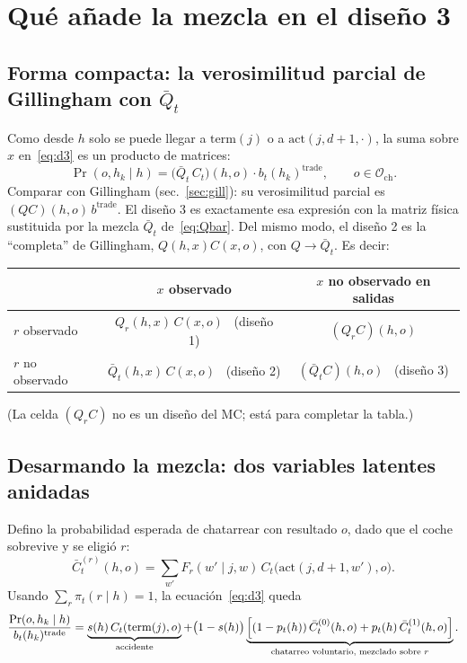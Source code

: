 \documentclass[11pt]{article}
\newcommand{\act}{\mathrm{act}}
\newcommand{\term}{\mathrm{term}}
\newcommand{\buy}{b}
\newcommand{\1}{\mathbf{1}}
\newcommand{\Osc}{\mathcal{O}_{\mathrm{ch}}}
\newcommand{\Qbar}{\bar Q}
\begin{document}
\section{Qué añade la mezcla en el diseño 3}\label{sec:mezcla3}

\subsection{Forma compacta: la verosimilitud parcial de Gillingham con $\Qbar_t$}

Como desde $h$ solo se puede llegar a $\term(j)$ o a $\act(j,d+1,\cdot)$, la suma sobre $x$
en~\eqref{eq:d3} es un producto de matrices:
\begin{equation}\label{eq:compacta}
  \boxed{\;\Pr(o,h_k\mid h)=\bigl(\Qbar_t\,C_t\bigr)(h,o)\cdot\buy_t(h_k)^{\text{trade}},\qquad o\in\Osc.\;}
\end{equation}
Comparar con Gillingham (sec.~\ref{sec:gill}): su verosimilitud parcial es
$(QC)(h,o)\,\buy^{\text{trade}}$. El diseño 3 es exactamente esa expresión con la matriz
física sustituida por la mezcla $\Qbar_t$ de~\eqref{eq:Qbar}. Del mismo modo, el diseño 2 es
la ``completa'' de Gillingham, $Q(h,x)C(x,o)$, con $Q\to\Qbar_t$. Es decir:

\begin{center}
\begin{tabular}{lcc}
\toprule
 & $x$ observado & $x$ no observado en salidas\\
\midrule
$r$ observado & $Q_r(h,x)\,C(x,o)$ \ (diseño 1) & $(Q_rC)(h,o)$\\
$r$ no observado & $\Qbar_t(h,x)\,C(x,o)$ \ (diseño 2) & $(\Qbar_tC)(h,o)$ \ (diseño 3)\\
\bottomrule
\end{tabular}
\end{center}

\noindent (La celda $(Q_rC)$ no es un diseño del MC; está para completar la tabla.)

\subsection{Desarmando la mezcla: dos variables latentes anidadas}

Defino la probabilidad esperada de chatarrear con resultado $o$, dado que el coche
sobrevive y se eligió $r$:
\begin{equation}\label{eq:Cbar}
  \bar C^{(r)}_t(h,o)=\sum_{w'}F_r(w'\mid j,w)\,C_t\bigl(\act(j,d+1,w'),o\bigr).
\end{equation}
Usando $\sum_r\pi_t(r\mid h)=1$, la ecuación~\eqref{eq:d3} queda
\begin{equation}\label{eq:d3b}
  \frac{\Pr(o,h_k\mid h)}{\buy_t(h_k)^{\text{trade}}}=
  \underbrace{s(h)\,C_t(\term(j),o)}_{\text{accidente}}
  +\bigl(1-s(h)\bigr)\underbrace{\Bigl[(1-p_t(h))\,\bar C^{(0)}_t(h,o)+p_t(h)\,\bar C^{(1)}_t(h,o)\Bigr]}_{\text{chatarreo voluntario, mezclado sobre } r}.
\end{equation}
\end{document}
